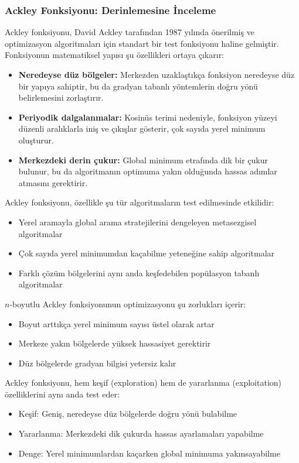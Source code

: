 \subsubsection{Ackley Fonksiyonu: Derinlemesine İnceleme}

Ackley fonksiyonu, David Ackley tarafından 1987 yılında önerilmiş ve optimizasyon algoritmaları için standart bir test fonksiyonu haline gelmiştir. Fonksiyonun matematiksel yapısı şu özellikleri ortaya çıkarır:

\begin{itemize}
    \item \textbf{Neredeyse düz bölgeler:} Merkezden uzaklaştıkça fonksiyon neredeyse düz bir yapıya sahiptir, bu da gradyan tabanlı yöntemlerin doğru yönü belirlemesini zorlaştırır.
    
    \item \textbf{Periyodik dalgalanmalar:} Kosinüs terimi nedeniyle, fonksiyon yüzeyi düzenli aralıklarla iniş ve çıkışlar gösterir, çok sayıda yerel minimum oluşturur.
    
    \item \textbf{Merkezdeki derin çukur:} Global minimum etrafında dik bir çukur bulunur, bu da algoritmanın optimuma yakın olduğunda hassas adımlar atmasını gerektirir.
\end{itemize}

Ackley fonksiyonu, özellikle şu tür algoritmaların test edilmesinde etkilidir:

\begin{itemize}
    \item Yerel aramayla global arama stratejilerini dengeleyen metasezgisel algoritmalar
    \item Çok sayıda yerel minimumdan kaçabilme yeteneğine sahip algoritmalar
    \item Farklı çözüm bölgelerini aynı anda keşfedebilen popülasyon tabanlı algoritmalar
\end{itemize}

$n$-boyutlu Ackley fonksiyonunun optimizasyonu şu zorlukları içerir:
\begin{itemize}
    \item Boyut arttıkça yerel minimum sayısı üstel olarak artar
    \item Merkeze yakın bölgelerde yüksek hassasiyet gerektirir
    \item Düz bölgelerde gradyan bilgisi yetersiz kalır
\end{itemize}

\begin{tcolorbox}[title=Ackley Fonksiyonu Optimizasyon Zorluğu]
Ackley fonksiyonu, hem keşif (exploration) hem de yararlanma (exploitation) özelliklerini aynı anda test eder:
\begin{itemize}
    \item Keşif: Geniş, neredeyse düz bölgelerde doğru yönü bulabilme
    \item Yararlanma: Merkezdeki dik çukurda hassas ayarlamaları yapabilme
    \item Denge: Yerel minimumlardan kaçarken global minimuma yakınsayabilme
\end{itemize}
\end{tcolorbox}

